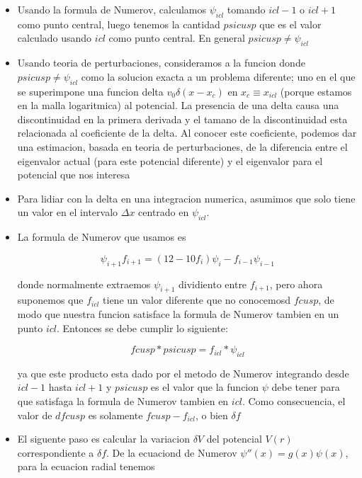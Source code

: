 \documentclass[11pt]{article}
\begin{document}
\begin{itemize}
\item Usando la formula de Numerov, calculamos \(\psi_{icl}\) tomando \(icl-1\) o \(icl+1\) como punto central, luego tenemos la cantidad \(psicusp\) que es el valor calculado usando \(icl\) como punto central. En general \(psicusp \neq \psi_{icl}\)

\item Usando teoria de perturbaciones, consideramos a la funcion donde \(psicusp \neq \psi_{icl}\) como la solucion exacta a un problema diferente; uno en el que se superimpone una funcion delta \(v_0\delta(x-x_c)\) en \(x_c \equiv x_{icl}\) (porque estamos en la malla logaritmica) al potencial. La presencia de una delta causa una discontinuidad en la primera derivada y el tamano de la discontinuidad esta relacionada al coeficiente de la delta. Al conocer este coeficiente, podemos dar una estimacion, basada en teoria de perturbaciones, de la diferencia entre el eigenvalor actual (para este potencial diferente) y el eigenvalor para el potencial que nos interesa

\item Para lidiar con la delta en una integracion numerica, asumimos que solo tiene un valor en el intervalo \(\Delta x\) centrado en \(\psi_{icl}\).

\item La formula de Numerov que usamos es

\[ \psi_{i+1}f_{i+1} = (12-10f_i)\psi_i - f_{i-1}\psi_{i-1} \]   

donde normalmente extraemos \(\psi_{i+1}\) dividiento entre \(f_{i+1}\), pero ahora suponemos que \(f_{icl}\) tiene un valor diferente que no conocemosd \(fcusp\), de modo que nuestra funcion satisface la formula de Numerov tambien en un punto \(icl\). Entonces se debe cumplir lo siguiente:

\[ fcusp * psicusp = f_{icl}*\psi_{icl} \]

ya que este producto esta dado por el metodo de Numerov integrando desde \(icl-1\) hasta \(icl+1\) y \(psicusp\) es el valor que la funcion \(\psi\) debe tener para que satisfaga la formula de Numerov tambien en \(icl\). Como consecuencia, el valor de \(dfcusp\) es solamente \(fcusp-f_{icl}\), o bien \(\delta f\)

\item El siguente paso es calcular la variacion \(\delta V\) del potencial \(V(r)\) correspondiente a \(\delta f\). De la ecuaciond de Numerov \(\psi''(x) = g(x)\psi(x)\), para la ecuacion radial tenemos


\end{itemize}
\end{document}
